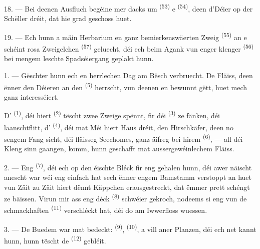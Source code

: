 18. --- Bei deenen Ausfluch begéine mer dacks um  \textsuperscript{(53)}
e  \textsuperscript{(54)}, deen d'Déier op der Schëller dréit, dat
hie grad geschoss huet.

19. --- Ech hunn a mäin Herbarium en ganz bemierkenswäerten Zweig 
\textsuperscript{(55)} an e schéint rosa Zweigelchen 
\textsuperscript{(57)} geluecht, déi ech beim Agank vun enger klenger 
\textsuperscript{(56)} bei mengem leschte Spadséiergang geplakt hunn.

\VUsaut{3.0mm}
\VUsaut{3.0mm}

\VUsaut{3.0mm}

1. --- Gëschter hunn ech en herrlechen Dag am Bësch verbruecht. De Fläiss, deen ënner
den Déieren an den  \textsuperscript{(5)} herrscht, vun deenen en
bewunnt gëtt, huet mech ganz interesséiert.

D' \textsuperscript{(1)}, déi hiert  \textsuperscript{(2)}
tëscht zwee Zweige spënnt, fir déi  \textsuperscript{(3)} ze fänken, déi
laanschtflitt, d' \textsuperscript{(4)}, déi mat Méi hiert Haus
dréit, den Hirschkäfer, deen no sengem Fang sicht, déi fläisseg Seechomes, ganz
äifreg bei hirem  \textsuperscript{(6)}, --- all déi Kleng
sinn gaangen, komm, hunn geschafft mat aussergewéinlechem Fläiss.

2. --- Eng  \textsuperscript{(7)}, déi ech op den éischte Bléck fir
eng  gehalen hunn, déi awer näischt anescht war wéi eng einfach
 hat sech ënner engem Bamstamm verstoppt an huet vun Zäit zu
Zäit hiert dënnt Käppchen erausgestreckt, dat ëmmer prett schéngt ze bäissen. Virun
mir ass eng déck  \textsuperscript{(8)} schwéier gekroch, nodeems
si eng vun de schmackhaften  \textsuperscript{(11)} verschléckt
hat, déi do am Iwwerfloss wuessen.

3. --- De Buedem war mat  bedeckt:
 \textsuperscript{(9)}, 
\textsuperscript{(10)}, a vill aner Planzen, déi ech net kannt hunn, hunn tëscht
de  \textsuperscript{(12)} gebléit.

